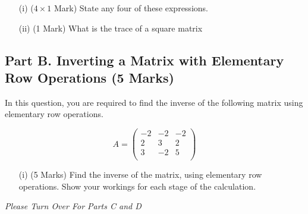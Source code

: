 \documentclass[a4paper,12pt]{article}
\begin{document}
	\begin{itemize}
		\item[(i)] ($4 \times 1$ Mark)
		State any four of these expressions.
		\item[(ii)] (1 Mark) What is the trace of a square matrix
	\end{itemize}
	
	\subsection*{Part B. Inverting a Matrix with Elementary Row Operations  (5 Marks)}	
In this question, you are required to find the inverse of the following matrix using elementary row operations.
	
	\begin{equation*}
	A=\left( \begin{array}{rrr}
-2  &  -2  &  -2\\
2  &  3  &  2\\
3  & -2  &  5\\
	\end{array} \right)
	\end{equation*}
	
	
			\begin{itemize}
			
				
				
				\item[(i)] (5 Marks) Find the inverse of the matrix, using elementary row operations. Show your workings for each stage of the calculation.
			\end{itemize}
			\medskip
		\noindent 	\textit{Please Turn Over For Parts C and D}
\newpage
\end{document}
